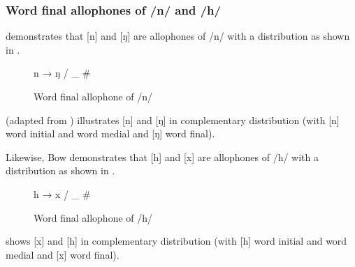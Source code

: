 \subsubsection{Word final allophones of /n/ and /h/}\label{sec:2.2.4.1}

\citealt{Bow1997c} demonstrates that [n] and [ŋ] are allophones of /n/ with a distribution as shown in .

\begin{figure}\caption{Word final allophone of /n/\label{fig:2.2}}
n → ŋ / \_ \#
\end{figure}

 (adapted from \citealt{Bow1997c}) illustrates [n]{ }and [ŋ] in complementary distribution (with [n]{ }word initial and word medial and [ŋ] word final).

\begin{table}[H] %
\caption{Complementary distribution for /n/\label{tab:2.8}}
\end{table}

Likewise, Bow demonstrates that [h] and [x] are allophones of /h/ with a distribution as shown in . 

\begin{figure}
\centering h → x / \_ \#
\caption{Word final allophone of /h/\label{fig:2.3}}
\end{figure}

\largerpage
{} shows [x] and [h] in complementary distribution (with [h]{ }word initial and word medial and [x] word final).

\begin{table}[H] %
\caption{Complementary distribution for /h/\label{tab:2.9}}
\end{table}

